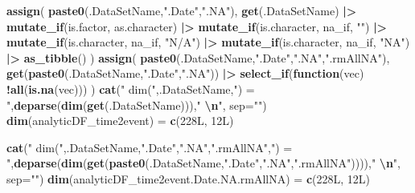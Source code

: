 \documentclass[
]{article}
\newenvironment{Shaded}{\begin{snugshade}}{\end{snugshade}}
\newcommand{\AttributeTok}[1]{\textcolor[rgb]{0.13,0.29,0.53}{#1}}
\newcommand{\ControlFlowTok}[1]{\textcolor[rgb]{0.13,0.29,0.53}{\textbf{#1}}}
\newcommand{\FunctionTok}[1]{\textcolor[rgb]{0.13,0.29,0.53}{\textbf{#1}}}
\newcommand{\NormalTok}[1]{#1}
\newcommand{\OtherTok}[1]{\textcolor[rgb]{0.56,0.35,0.01}{#1}}
\newcommand{\SpecialCharTok}[1]{\textcolor[rgb]{0.81,0.36,0.00}{\textbf{#1}}}
\newcommand{\StringTok}[1]{\textcolor[rgb]{0.31,0.60,0.02}{#1}}
\begin{document}
\begin{Shaded}
\begin{Highlighting}[]
\FunctionTok{assign}\NormalTok{( }\FunctionTok{paste0}\NormalTok{(.DataSetName,}\StringTok{".Date"}\NormalTok{,}\StringTok{".NA"}\NormalTok{), }\FunctionTok{get}\NormalTok{(.DataSetName) }\SpecialCharTok{|\textgreater{}} \FunctionTok{mutate\_if}\NormalTok{(is.factor, as.character) }\SpecialCharTok{|\textgreater{}} \FunctionTok{mutate\_if}\NormalTok{(is.character, na\_if, }\StringTok{""}\NormalTok{) }\SpecialCharTok{|\textgreater{}} \FunctionTok{mutate\_if}\NormalTok{(is.character, na\_if, }\StringTok{"N/A"}\NormalTok{) }\SpecialCharTok{|\textgreater{}} \FunctionTok{mutate\_if}\NormalTok{(is.character, na\_if, }\StringTok{"NA"}\NormalTok{) }\SpecialCharTok{|\textgreater{}} \FunctionTok{as\_tibble}\NormalTok{() )}
\FunctionTok{assign}\NormalTok{( }\FunctionTok{paste0}\NormalTok{(.DataSetName,}\StringTok{".Date"}\NormalTok{,}\StringTok{".NA"}\NormalTok{,}\StringTok{".rmAllNA"}\NormalTok{), }\FunctionTok{get}\NormalTok{(}\FunctionTok{paste0}\NormalTok{(.DataSetName,}\StringTok{".Date"}\NormalTok{,}\StringTok{".NA"}\NormalTok{)) }\SpecialCharTok{|\textgreater{}} \FunctionTok{select\_if}\NormalTok{(}\ControlFlowTok{function}\NormalTok{(vec) }\SpecialCharTok{!}\FunctionTok{all}\NormalTok{(}\FunctionTok{is.na}\NormalTok{(vec))) )}
\FunctionTok{cat}\NormalTok{(}\StringTok{" dim("}\NormalTok{,.DataSetName,}\StringTok{") = "}\NormalTok{,}\FunctionTok{deparse}\NormalTok{(}\FunctionTok{dim}\NormalTok{(}\FunctionTok{get}\NormalTok{(.DataSetName))),}\StringTok{"  }\SpecialCharTok{\textbackslash{}n}\StringTok{"}\NormalTok{, }\AttributeTok{sep=}\StringTok{""}\NormalTok{) }
 \FunctionTok{dim}\NormalTok{(analyticDF\_time2event) }\OtherTok{=} \FunctionTok{c}\NormalTok{(228L, 12L)  }
\end{Highlighting}
\end{Shaded}

\begin{Shaded}
\begin{Highlighting}[]
\FunctionTok{cat}\NormalTok{(}\StringTok{" dim("}\NormalTok{,.DataSetName,}\StringTok{".Date"}\NormalTok{,}\StringTok{".NA"}\NormalTok{,}\StringTok{".rmAllNA"}\NormalTok{,}\StringTok{") = "}\NormalTok{,}\FunctionTok{deparse}\NormalTok{(}\FunctionTok{dim}\NormalTok{(}\FunctionTok{get}\NormalTok{(}\FunctionTok{paste0}\NormalTok{(.DataSetName,}\StringTok{".Date"}\NormalTok{,}\StringTok{".NA"}\NormalTok{,}\StringTok{".rmAllNA"}\NormalTok{)))),}\StringTok{"  }\SpecialCharTok{\textbackslash{}n}\StringTok{"}\NormalTok{, }\AttributeTok{sep=}\StringTok{""}\NormalTok{) }
 \FunctionTok{dim}\NormalTok{(analyticDF\_time2event.Date.NA.rmAllNA) }\OtherTok{=} \FunctionTok{c}\NormalTok{(228L, 12L)  }
\end{Highlighting}
\end{Shaded}
\end{document}
